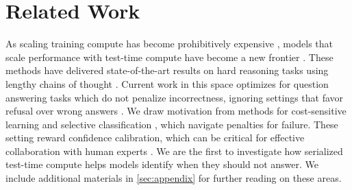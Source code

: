 \section{Related Work}
As scaling training compute has become prohibitively expensive \cite{hoffmann_training_2022}, models that scale performance with test-time compute have become a new frontier \cite{snell2024scalingllmtesttimecompute, wu_inference_2024}. These methods have delivered state-of-the-art results on hard reasoning tasks using lengthy chains of thought \cite{deepseek-ai_deepseek-r1_2025, muennighoff_s1_2025}. Current work in this space optimizes for question answering tasks which do not penalize incorrectness, ignoring settings that favor refusal over wrong answers \cite{ferrucci_building_2010, rajpurkar_know_2018, kamath-etal-2020-selective}.
We draw motivation from methods for cost-sensitive learning \cite{mienye_performance_2021} and selective classification \cite{geifman_selective_2017}, which navigate penalties for failure. These setting reward confidence calibration, which can be critical for effective collaboration with human experts \cite{verma_learning_2023}. We are the first to investigate how serialized test-time compute helps models identify when they should not answer.
We include additional materials in \cref{sec:appendix} for further reading on these areas.